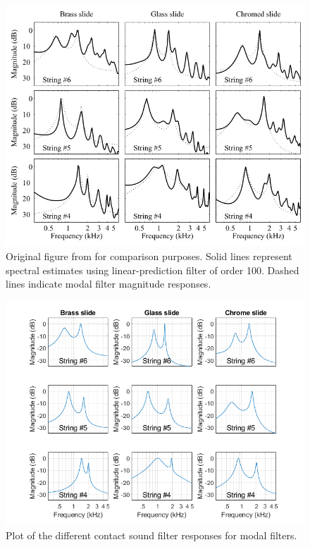 \documentclass[../main.tex]{subfiles}
\begin{document}
\begin{figure}[h]
    \centering
    \includegraphics[scale=.65]{./images/plots/LongitudinalModeFiltersOriginal.png}
    \caption{Original figure from  for comparison purposes. Solid lines represent spectral estimates using linear-prediction filter of order 100. Dashed lines indicate modal filter magnitude responses.}
    \label{fig:LongModeOrig}
\end{figure}

\begin{figure}[h]
    \centering
    \includegraphics[scale=.65]{./images/plots/LongitudinalModeFiltersRecreation.png}
    \caption{Plot of the different contact sound filter responses for modal filters.}
    \label{fig:LongModeRecr}
\end{figure}
\end{document}
